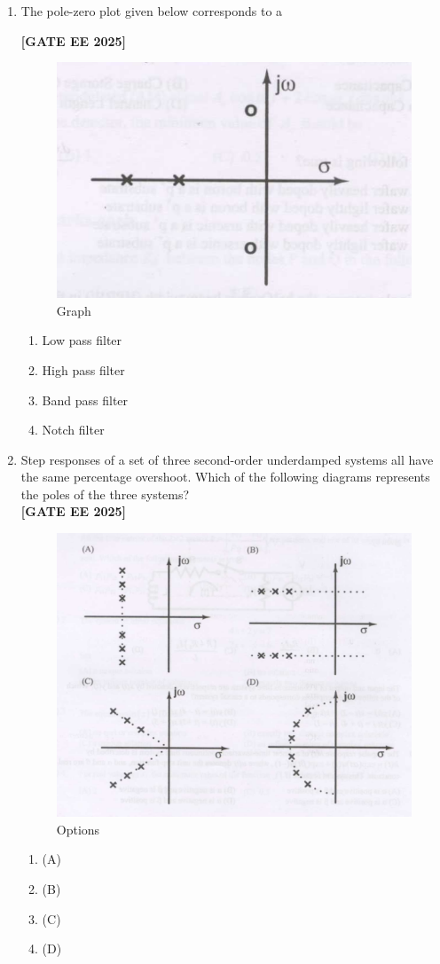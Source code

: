 \documentclass[12pt]{article}
\begin{document}
\begin{enumerate}[leftmargin=2.5em, label=\textbf{Q.\arabic*}., itemsep=2em]
\item The pole-zero plot given below corresponds to a
 
\noindent \textbf{[GATE EE 2025]}
\begin{figure}[H]\centering
\includegraphics[width=0.5\columnwidth]{figs/q11.png}
\caption{Graph}
\label{fig:q11}
\end{figure}
\begin{enumerate}
    \item Low pass filter
    \item High pass filter
    \item Band pass filter
    \item Notch filter
\end{enumerate}

\item Step responses of a set of three second-order underdamped systems all have the same percentage overshoot. Which of the following diagrams represents the poles of the three systems?\\
 
\noindent \textbf{[GATE EE 2025]}
\begin{figure}[H]\centering
\includegraphics[width=0.95\columnwidth]{figs/q12.png}
\caption{Options}
\label{fig:q12}
\end{figure}
\begin{enumerate}
  \item (A)
  \item (B)
  \item (C)
  \item (D)
\end{enumerate}


\end{enumerate}
\end{document}
